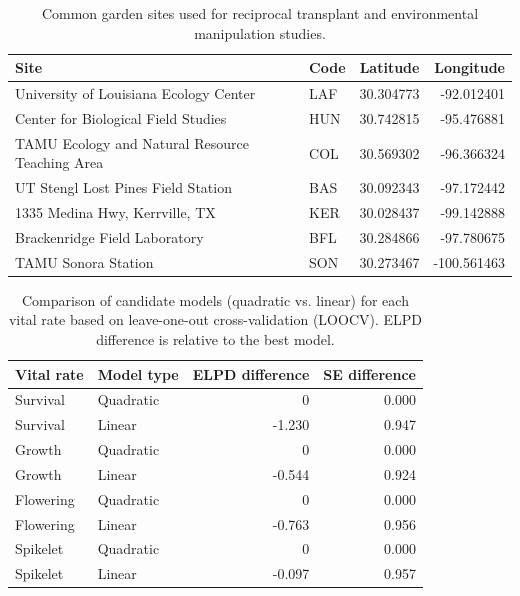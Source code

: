 \documentclass[12pt]{article}\usepackage[]{graphicx}\usepackage[dvipsnames]{xcolor}
\begin{document}
\begin{table}[ht]
\caption[Geographic coordinates of common garden sites for study species]{Common garden sites used for reciprocal transplant and environmental manipulation studies.}
\label{tab:exp_sites}
\begin{tabular}{llrr}
\hline
\textbf{Site} & \textbf{Code} & \textbf{Latitude} & \textbf{Longitude} \\
\hline
University of Louisiana Ecology Center & LAF & 30.304773 & -92.012401 \\
Center for Biological Field Studies & HUN & 30.742815 & -95.476881 \\
TAMU Ecology and Natural Resource Teaching Area & COL & 30.569302 & -96.366324 \\
UT Stengl Lost Pines Field Station & BAS & 30.092343 & -97.172442 \\
1335 Medina Hwy, Kerrville, TX & KER & 30.028437 & -99.142888 \\
Brackenridge Field Laboratory & BFL & 30.284866 & -97.780675 \\
TAMU Sonora Station & SON & 30.273467 & -100.561463 \\
\hline
\end{tabular}
\end{table}
\clearpage 

\begin{table}[ht]
\centering
\caption[Model comparison for vital rates (quadratic vs. linear models)]{Comparison of candidate models (quadratic vs. linear) for each vital rate based on leave-one-out cross-validation (LOOCV). 
ELPD difference is relative to the best model.}
\label{tab:model_comparison}
\begin{tabular}{l l r r}
\hline
\textbf{Vital rate} & \textbf{Model type} & \textbf{ELPD difference} & \textbf{SE difference} \\
\hline
Survival   & Quadratic & 0       & 0.000 \\
Survival   & Linear    & -1.230  & 0.947 \\
Growth     & Quadratic & 0       & 0.000 \\
Growth     & Linear    & -0.544  & 0.924 \\
Flowering  & Quadratic & 0       & 0.000 \\
Flowering  & Linear    & -0.763  & 0.956 \\
Spikelet   & Quadratic & 0       & 0.000 \\
Spikelet   & Linear    & -0.097  & 0.957 \\
\hline
\end{tabular}
\end{table}
\clearpage 
\end{document}
